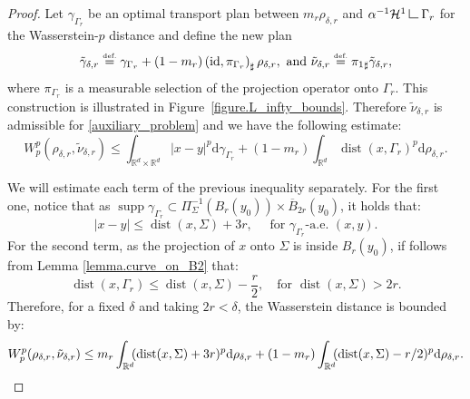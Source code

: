 \documentclass[10pt]{amsart}
\theoremstyle{definition}
\newcommand{\eqdef}{\ensuremath{\stackrel{\mbox{\upshape\tiny def.}}{=}}}
\newcommand\LM[1]{\hbox{\vrule width.5pt \vbox to#1pt{\vfill \hrule width#1pt height.5pt}}}
\newcommand\LL{{\mathchoice {\>\LM7\>}{\>\LM7\>}{\,\LM5\,}{\,\LM{3.35}\,}}}
\newcommand{\mres}{\LL}
\newcommand\cH{\mathcal{H}}
\newcommand{\RR}{\mathbb{R}}
\DeclareMathOperator{\dist}{dist}
\DeclareMathOperator{\supp}{supp}
\newcommand\dd{\mathrm{d}}
\begin{document}
\begin{proof}
Let $\gamma_{\Gamma_{r}}$ be an optimal transport plan between $m_r\rho_{\delta, r}$ and $\alpha^{-1}\cH^1\mres \Gamma_{r}$ for the Wasserstein-$p$ distance and define the new plan
\[
\tilde \gamma_{\delta, r}
\eqdef
\gamma_{\Gamma_{r}}
+
(1-m_{r})
\left(
\text{id},
\pi_{\Gamma_{r}}
\right)_\sharp
\rho_{\delta, r},
\text{ and }
\tilde\nu_{\delta, r}
\eqdef {\pi_{1}}_\sharp \tilde \gamma_{\delta, r},
\]
where $\pi_{\Gamma_{r}}$ is a measurable selection of the projection operator onto $\Gamma_{r}$. This construction is illustrated in Figure~\ref{figure.L_infty_bounds}. Therefore $\tilde\nu_{\delta, r}$ is admissible for \eqref{auxiliary_problem} and we have the following estimate:
\begin{equation*}
W_p^p(\rho_{\delta, r}, \tilde\nu_{\delta, r})
\le
\int_{\RR^d\times \RR^d} |x - y|^p\dd \gamma_{\Gamma_{r}}
+
(1 - m_{r})\int_{\RR^d} \dist(x, \Gamma_r)^p\dd \rho_{\delta,r}.
\end{equation*}

We will estimate each term of the previous inequality separately. For the first one, notice that as $\supp \gamma_{\Gamma_{r}} \subset \Pi_{\Sigma}^{-1}(B_r(y_0)) \times \overline{B}_{2r}(y_0)$, it holds that:
\[
|x - y| \le \dist(x,\Sigma) + 3r, \quad \text{ for $\gamma_{\Gamma_{r}}$-a.e.\ $(x,y)$}.
\]
For the second term, as the projection of $x$ onto $\Sigma$ is inside $B_r(y_0)$, if follows from Lemma \ref{lemma.curve_on_B2} that:
\[
\dist(x, \Gamma_r) \le \dist(x, \Sigma) - \frac{r}{2}, \quad\text{for } \dist(x, \Sigma) > 2r.
\]
Therefore, for a fixed $\delta$ and taking $2r < \delta$, the Wasserstein distance is bounded by:
\[
W_p^p(\rho_{\delta, r}, \tilde\nu_{\delta, r})
\le
m_{r}
\int_{\RR^d}\hspace*{-1mm}
(\dist(x,\Sigma) + 3r)^p\dd \rho_{\delta,r}
+
(1 - m_{r})
\int_{\RR^d}\hspace*{-1mm}
(\dist(x, \Sigma) - r/2)^p\dd \rho_{\delta,r}.
\]


\end{proof}
\end{document}
